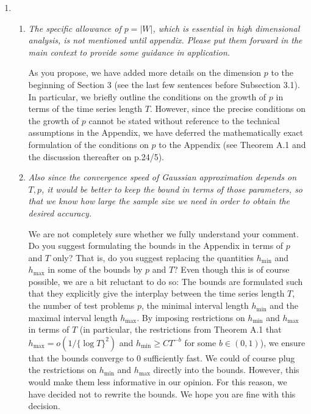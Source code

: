 \documentclass[a4paper,12pt]{article}
\begin{document}
\begin{enumerate}[label=(\arabic*),leftmargin=0.7cm]
\item \begin{enumerate}[label=(\alph*),leftmargin=0.7cm]
\item \textit{The specific allowance of $p = |W|$, which is essential in high dimensional analysis, is not mentioned until appendix. Please put them forward in the main context to provide some guidance in application.}

As you propose, we have added more details on the dimension $p$ to the beginning of Section 3 (see the last few sentences before Subsection 3.1). In particular, we briefly outline the conditions on the growth of $p$ in terms of the time series length $T$. 
However, since the precise conditions on the growth of $p$ cannot be stated without reference to the technical assumptions in the Appendix, we have deferred the mathematically exact formulation of the conditions on $p$ to the Appendix (see Theorem A.1 and the discussion thereafter on p.24/5). 


\newpage
\item \textit{Also since the convergence speed of Gaussian approximation depends on $T, p$, it would be better to keep the bound in terms of those parameters, so that we know how large the sample size we need in order to obtain the desired accuracy.}

We are not completely sure whether we fully understand your comment. Do you suggest formulating the bounds in the Appendix in terms of $p$ and $T$ only? That is, do you suggest replacing the quantities $h_{\min}$ and $h_{\max}$ in some of the bounds by $p$ and $T$? Even though this is of course possible, we are a bit reluctant to do so: The bounds are formulated such that they explicitly give the interplay between the time series length $T$, the number of test problems $p$, the minimal interval length $h_{\min}$ and the maximal interval length $h_{\max}$. By imposing restrictions on $h_{\min}$ and $h_{\max}$ in terms of $T$ (in particular, the restrictions from Theorem A.1 that $h_{\max} = o(1/\{\log T\}^2)$ and $h_{\min} \ge C T^{-b}$ for some $b \in (0,1)$), we ensure that the bounds converge to $0$ sufficiently fast. We could of course plug the restrictions on $h_{\min}$ and $h_{\max}$ directly into the bounds. However, this would make them less informative in our opinion. For this reason, we have decided not to rewrite the bounds. We hope you are fine with this decision. 
\end{enumerate}


\end{enumerate}
\end{document}
